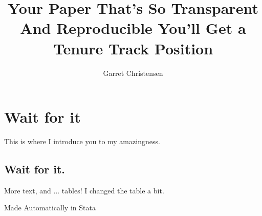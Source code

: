 \documentclass[11pt]{article} %
\title{Your Paper That's So Transparent And Reproducible You'll Get a Tenure Track Position}
\author{Garret Christensen}
\begin{document}
\maketitle

\section{Wait for it}

This is where I introduce you to my amazingness.

\subsection{Wait for it.}

More text, and ... tables! I changed the table a bit.

\begin{table}
\caption{Made Automatically in Stata}

\end{table}


% 
\end{document}

